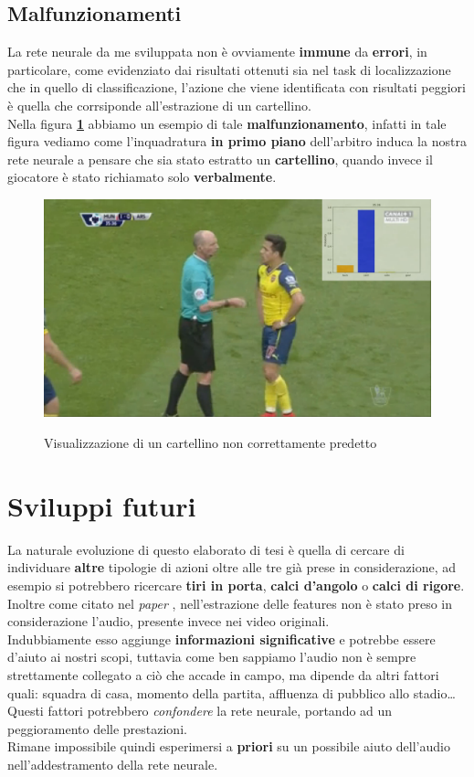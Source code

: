 \subsection{Malfunzionamenti}
La rete neurale da me sviluppata non è ovviamente \textbf{immune} da \textbf{errori}, in particolare, come evidenziato dai risultati ottenuti sia nel task di localizzazione che in quello di classificazione, l'azione che viene identificata con risultati peggiori è quella che corrsiponde all'estrazione di un cartellino.
\\Nella figura \textbf{\ref{figure : fakecard}} abbiamo un esempio di tale \textbf{malfunzionamento}, infatti in tale figura vediamo come l'inquadratura \textbf{in primo piano} dell'arbitro induca la nostra rete neurale a pensare che sia stato estratto un \textbf{cartellino}, quando invece il giocatore è stato richiamato solo \textbf{verbalmente}.
\begin{figure}[H]
\centering
\caption{Visualizzazione di un cartellino non correttamente predetto}
\includegraphics[width=\linewidth]{img/fakecard.png}
\label{figure : fakecard}
\end{figure}
\section{Sviluppi futuri}
La naturale evoluzione di questo elaborato di tesi è quella di cercare di individuare \textbf{altre} tipologie di azioni oltre alle tre già prese in considerazione, ad esempio si potrebbero ricercare \textbf{tiri in porta}, \textbf{calci d'angolo} o \textbf{calci di rigore}.
\\Inoltre come citato nel \textit{paper} \citep{soccerNet}, nell'estrazione delle features non è stato preso in considerazione l'audio, presente invece nei video originali.
\\Indubbiamente esso aggiunge \textbf{informazioni significative} e potrebbe essere d'aiuto ai nostri scopi, tuttavia come ben sappiamo l'audio non è sempre strettamente collegato a ciò che accade in campo, ma dipende da altri fattori quali: squadra di casa, momento della partita, affluenza di pubblico allo stadio\ldots
\\Questi fattori potrebbero \textit{confondere} la rete neurale, portando ad un peggioramento delle prestazioni.
\\Rimane impossibile quindi esperimersi a \textbf{priori} su un possibile aiuto dell'audio nell'addestramento della rete neurale.
